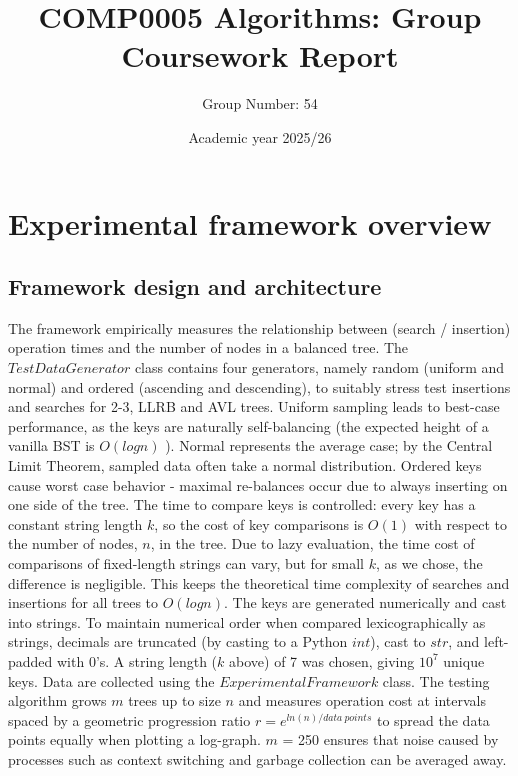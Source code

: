 \documentclass[12pt]{article}
\begin{document}
\title{COMP0005 Algorithms: Group Coursework Report}
\author{Group Number: 54}
\date{Academic year 2025/26}
\maketitle
\vspace{-4em}
\section{Experimental framework overview}
\vspace{-1em}
\subsection{Framework design and architecture}
The framework empirically measures the relationship between (search / insertion) operation times and the number of nodes in a balanced tree.
The $TestDataGenerator$ class contains four generators, namely random (uniform and normal) and ordered (ascending and descending), to suitably stress test insertions and searches for 2-3, LLRB and AVL trees.
Uniform sampling leads to best-case performance, as the keys are naturally self-balancing (the expected height of a vanilla BST is $O(logn)$ \cite{algorithms}).
Normal represents the average case; by the Central Limit Theorem, sampled data often take a normal distribution.
Ordered keys cause worst case behavior - maximal re-balances occur due to always inserting on one side of the tree.
The time to compare keys is controlled: every key has a constant string length $k$, so the cost of key comparisons is $O(1)$ with respect to the number of nodes, $n$, in the tree.
Due to lazy evaluation, the time cost of comparisons of fixed-length strings can vary, but for small $k$, as we chose, the difference is negligible.
This keeps the theoretical time complexity of searches and insertions for all trees to $O(logn)$.
The keys are generated numerically and cast into strings. To maintain numerical order when compared lexicographically as strings, decimals are truncated (by casting to a Python $int$), cast to $str$, and left-padded with 0's.
A string length ($k$ above) of 7 was chosen, giving $10^7$ unique keys.
Data are collected using the $ExperimentalFramework$ class.
The testing algorithm grows $m$ trees up to size $n$ and measures operation cost at intervals spaced by a geometric progression ratio $r=e^{ln(n)/data \ points}$ to spread the data points equally when plotting a log-graph.
$m$ = 250 ensures that noise caused by processes such as context switching and garbage collection can be averaged away.
\end{document}
